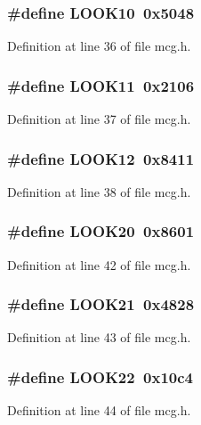 \subsubsection{\setlength{\rightskip}{0pt plus 5cm}\#define LOOK10\ 0x5048}\label{mcg_8h_a5}




Definition at line 36 of file mcg.h.
\subsubsection{\setlength{\rightskip}{0pt plus 5cm}\#define LOOK11\ 0x2106}\label{mcg_8h_a6}




Definition at line 37 of file mcg.h.
\subsubsection{\setlength{\rightskip}{0pt plus 5cm}\#define LOOK12\ 0x8411}\label{mcg_8h_a7}




Definition at line 38 of file mcg.h.
\subsubsection{\setlength{\rightskip}{0pt plus 5cm}\#define LOOK20\ 0x8601}\label{mcg_8h_a9}




Definition at line 42 of file mcg.h.
\subsubsection{\setlength{\rightskip}{0pt plus 5cm}\#define LOOK21\ 0x4828}\label{mcg_8h_a10}




Definition at line 43 of file mcg.h.
\subsubsection{\setlength{\rightskip}{0pt plus 5cm}\#define LOOK22\ 0x10c4}\label{mcg_8h_a11}




Definition at line 44 of file mcg.h.
